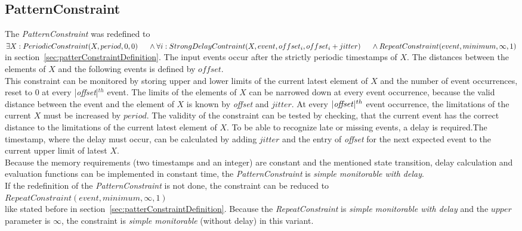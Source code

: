 \subsection{PatternConstraint}
	The \emph{PatternConstraint} was redefined to\\[10pt]
	\begin{math}
		\exists X: PeriodicConstraint(X, period, 0, 0)\\
		\text{\hspace{.5cm}} \land \forall i: StrongDelayContraint(X, event, offset_i, offset_i+jitter)\\
		\text{\hspace{.5cm}} \land RepeatConstraint(event, minimum, \infty, 1)
	\end{math}\\[10pt]
	in section~\ref{sec:patterConstraintDefinition}. The input events occur after the strictly periodic timestamps of $X$. The distances between the elements of $X$ and the following events is defined by $offset$.\\
	This constraint can be monitored by storing upper and lower limits of the current latest element of $X$ and the number of event occurrences, reset to 0 at every |\emph{offset}|$^{th}$ event. The limits of the elements of $X$ can be narrowed down at every event occurrence, because the valid distance between the event and the element of $X$ is known by \emph{offset} and $jitter$. At every $|\text{\emph{offset}}|^{th}$ event occurrence, the limitations of the current $X$ must be increased by $period$. The validity of the constraint can be tested by checking, that the current event has the correct distance to the limitations of the current latest element of $X$. To be able to recognize late or missing events, a delay is required.The timestamp, where the delay must occur, can be calculated by adding $jitter$ and the entry of \textit{offset} for the next expected event to the current upper limit of latest $X$.\\
	Because the memory requirements (two timestamps and an integer) are constant and the mentioned state transition, delay calculation and evaluation functions can be implemented in constant time, the \emph{PatternConstraint} is \textit{simple monitorable with delay}.\\[10 pt]
	If the redefinition of the \emph{PatternConstraint} is not done, the constraint can be reduced to\\[10pt]
	\begin{math}
		RepeatConstraint(event, minimum, \infty, 1)
	\end{math}\\[10pt]
	like stated before in section~\ref{sec:patterConstraintDefinition}. Because the \textit{RepeatConstraint} is \textit{simple monitorable with delay} and the $upper$ parameter is $\infty$, the constraint is \textit{simple monitorable} (without delay) in this variant.
	
